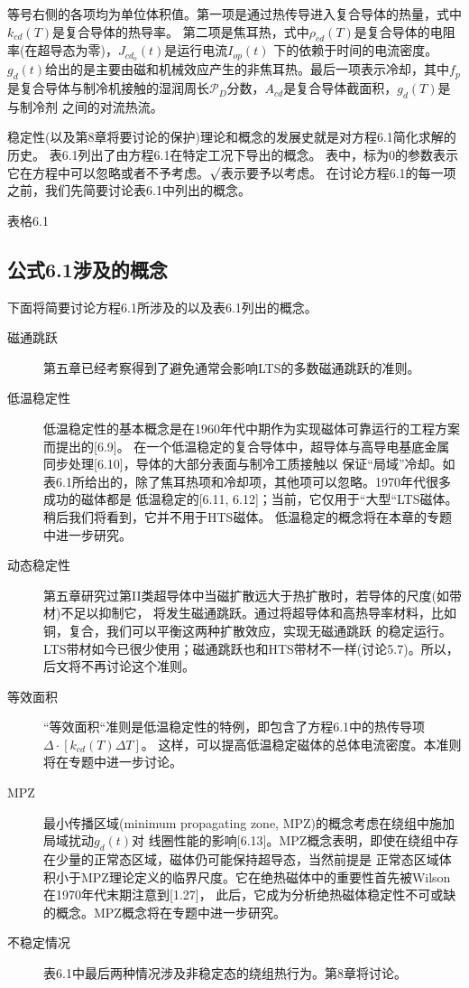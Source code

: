 等号右侧的各项均为单位体积值。第一项是通过热传导进入复合导体的热量，式中$k_{cd}(T)$是复合导体的热导率。
第二项是焦耳热，式中$\rho_{cd}(T)$是复合导体的电阻率(在超导态为零)，$J_{cd_o}(t)$是运行电流$I_{op}(t)$
下的依赖于时间的电流密度。$g_d(t)$给出的是主要由磁和机械效应产生的非焦耳热。最后一项表示冷却，其中$f_p$
是复合导体与制冷机接触的湿润周长$\mathcal{P}_D$分数，$A_{cd}$是复合导体截面积，$g_d(T)$是与制冷剂
之间的对流热流。

稳定性(以及第8章将要讨论的保护)理论和概念的发展史就是对方程6.1简化求解的历史。
表6.1列出了由方程6.1在特定工况下导出的概念。
表中，标为0的参数表示它在方程中可以忽略或者不予考虑。$\surd$表示要予以考虑。
在讨论方程6.1的每一项之前，我们先简要讨论表6.1中列出的概念。

表格6.1

\subsection{公式6.1涉及的概念}
下面将简要讨论方程6.1所涉及的以及表6.1列出的概念。
\begin{description}
  \item[磁通跳跃] 第五章已经考察得到了避免通常会影响LTS的多数磁通跳跃的准则。
  \item[低温稳定性] 低温稳定性的基本概念是在1960年代中期作为实现磁体可靠运行的工程方案而提出的[6.9]。
  在一个低温稳定的复合导体中，超导体与高导电基底金属同步处理[6.10]，导体的大部分表面与制冷工质接触以
  保证“局域”冷却。如表6.1所给出的，除了焦耳热项和冷却项，其他项可以忽略。1970年代很多成功的磁体都是
  低温稳定的[6.11, 6.12]；当前，它仅用于``大型``LTS磁体。稍后我们将看到，它并不用于HTS磁体。
  低温稳定的概念将在本章的专题中进一步研究。
  \item[动态稳定性] 第五章研究过第II类超导体中当磁扩散远大于热扩散时，若导体的尺度(如带材)不足以抑制它，
  将发生磁通跳跃。通过将超导体和高热导率材料，比如铜，复合，我们可以平衡这两种扩散效应，实现无磁通跳跃
  的稳定运行。LTS带材如今已很少使用；磁通跳跃也和HTS带材不一样(讨论5.7)。所以，后文将不再讨论这个准则。
  \item[等效面积] ``等效面积``准则是低温稳定性的特例，即包含了方程6.1中的热传导项$\Delta\cdot[k_{cd}(T)\Delta T]$。
  这样，可以提高低温稳定磁体的总体电流密度。本准则将在专题中进一步讨论。
  \item[MPZ] 最小传播区域(minimum propagating zone, MPZ)的概念考虑在绕组中施加局域扰动$g_d(t)$对
  线圈性能的影响[6.13]。MPZ概念表明，即使在绕组中存在少量的正常态区域，磁体仍可能保持超导态，当然前提是
  正常态区域体积小于MPZ理论定义的临界尺度。它在绝热磁体中的重要性首先被Wilson在1970年代末期注意到[1.27]，
  此后，它成为分析绝热磁体稳定性不可或缺的概念。MPZ概念将在专题中进一步研究。  
  \item[不稳定情况] 表6.1中最后两种情况涉及非稳定态的绕组热行为。第8章将讨论。
\end{description}

